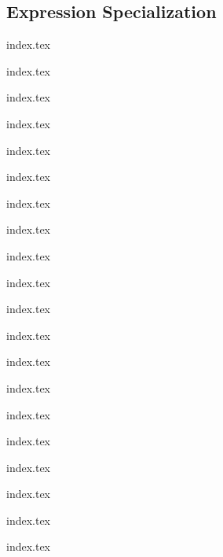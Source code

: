 
\subsection{Expression Specialization}
{
	\lipsum[1]
	
	{index.tex}
	
	{index.tex}
	
	{index.tex}
	
	{index.tex}
	
	{index.tex}
	
	{index.tex}
	
	{index.tex}
	
	{index.tex}
	
	{index.tex}
	
	{index.tex}
	
	{index.tex}
	
	{index.tex}
	
	{index.tex}
	
	{index.tex}
	
	{index.tex}
	
	{index.tex}
	
	{index.tex}
	
	{index.tex}
	
	{index.tex}
	
	{index.tex}
}













